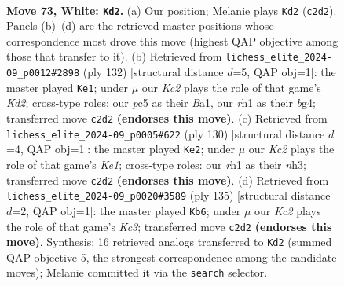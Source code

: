 \documentclass[11pt]{article}
\begin{document}
\clearpage

\begin{figure}[p]\centering
\begin{subfigure}{0.46\textwidth}\centering
\resizebox{\linewidth}{!}{%
\newchessgame
\chessboard[
  setfen={8/4k3/8/2pp4/p7/8/2K5/7r w - - 2 73},
  showmover=false,
  pgfstyle=straightmove, color=movearrow, markmove={c2-d2}
]}
\caption{}
\end{subfigure}\hfill
\begin{subfigure}{0.46\textwidth}\centering
\resizebox{\linewidth}{!}{%
\newchessgame
\chessboard[
  setfen={8/8/8/3k4/5pb1/8/p2K4/B7 w - - 0 67},
  showmover=false,
  pgfstyle=straightmove, color=movearrow, markmove={d2-e1}
]}
\caption{}
\end{subfigure}
\\[4pt]
\begin{subfigure}{0.46\textwidth}\centering
\resizebox{\linewidth}{!}{%
\newchessgame
\chessboard[
  setfen={8/6k1/8/7p/8/7n/6p1/4K3 w - - 0 66},
  showmover=false,
  pgfstyle=straightmove, color=movearrow, markmove={e1-e2}
]}
\caption{}
\end{subfigure}\hfill
\begin{subfigure}{0.46\textwidth}\centering
\resizebox{\linewidth}{!}{%
\newchessgame
\chessboard[
  setfen={4K3/8/2k5/R7/8/1P5P/8/8 b - - 0 68},
  showmover=false,
  pgfstyle=straightmove, color=movearrow, markmove={c6-b6}
]}
\caption{}
\end{subfigure}
\caption{\textbf{Move 73, White: \texttt{Kd2}.} (a) Our position; Melanie plays \texttt{Kd2} (\texttt{c2d2}). Panels (b)--(d) are the retrieved master positions whose correspondence most drove this move (highest QAP objective among those that transfer to it). (b) Retrieved from \texttt{lichess\_elite\_2024-09\_p0012\#2898} (ply 132) [structural distance $d$=5, QAP obj=1]: the master played \texttt{Ke1}; under $\mu$ our \emph{Kc2} plays the role of that game's \emph{Kd2}; cross-type roles: our \emph{p}c5 as their \emph{B}a1, our \emph{r}h1 as their \emph{b}g4; transferred move \texttt{c2d2} \textbf{(endorses this move)}. (c) Retrieved from \texttt{lichess\_elite\_2024-09\_p0005\#622} (ply 130) [structural distance $d$=4, QAP obj=1]: the master played \texttt{Ke2}; under $\mu$ our \emph{Kc2} plays the role of that game's \emph{Ke1}; cross-type roles: our \emph{r}h1 as their \emph{n}h3; transferred move \texttt{c2d2} \textbf{(endorses this move)}. (d) Retrieved from \texttt{lichess\_elite\_2024-09\_p0020\#3589} (ply 135) [structural distance $d$=2, QAP obj=1]: the master played \texttt{Kb6}; under $\mu$ our \emph{Kc2} plays the role of that game's \emph{Kc3}; transferred move \texttt{c2d2} \textbf{(endorses this move)}. Synthesis: 16 retrieved analogs transferred to \texttt{Kd2} (summed QAP objective 5, the strongest correspondence among the candidate moves); Melanie committed it via the \texttt{search} selector.}
\label{fig:thought-m144}
\end{figure}
\end{document}
